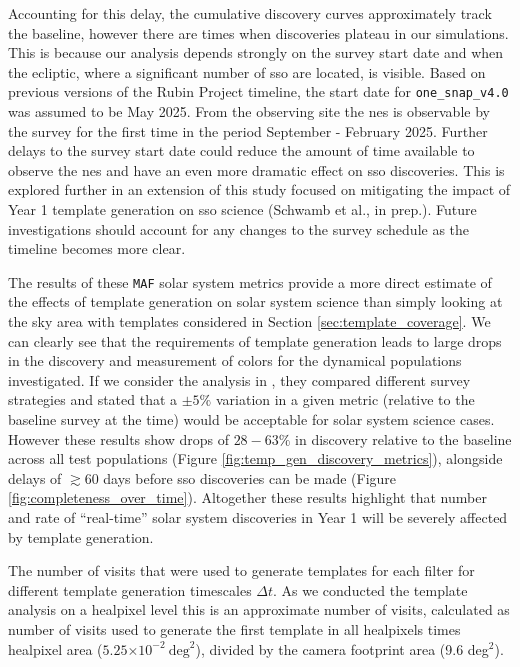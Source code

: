 \documentclass[preprintm,linenumbers]{aastex631}
\newcommand{\baseline}{\texttt{one\_snap\_v4.0}\xspace}
\newcommand{\maf}{\texttt{MAF}\xspace}
\providecommand{\e}[1]{\ensuremath{\times 10^{#1}}}
\begin{document}
Accounting for this delay, the cumulative discovery curves approximately track the baseline, however there are times when discoveries plateau in our simulations.
This is because our analysis depends strongly on the survey start date and when the ecliptic, where a significant number of \gls*{sso} are located, is visible. 
Based on previous versions of the Rubin Project timeline, the start date for \baseline was assumed to be May 2025.
From the observing site the \gls*{nes} is observable by the survey for the first time in the period September - February 2025. 
Further delays to the survey start date could reduce the amount of time available to observe the \gls*{nes} and have an even more dramatic effect on \gls*{sso} discoveries.
This is explored further in an extension of this study focused on mitigating the impact of Year 1 template generation on \gls*{sso} science (Schwamb et al., in prep.).
Future investigations should account for any changes to the survey schedule as the timeline becomes more clear.
		
		The results of these \maf solar system metrics provide a more direct estimate of the effects of template generation on solar system science than simply looking at the sky area with templates considered in Section \ref{sec:template_coverage}.
		We can clearly see that the requirements of template generation leads to large drops in the discovery and measurement of colors for the dynamical populations investigated.
		If we consider the analysis in \cite{schwambTuningLegacySurvey2023}, they compared different survey strategies and stated that a $\pm5\%$ variation in a given metric (relative to the baseline survey at the time) would be acceptable for solar system science cases.
		However these results show drops of $28-63\%$ in discovery relative to the baseline across all test populations (Figure \ref{fig:temp_gen_discovery_metrics}), alongside delays of $\gtrsim 60$ days before \gls*{sso} discoveries can be made (Figure \ref{fig:completeness_over_time}).
		Altogether these results highlight that number and rate of ``real-time'' solar system discoveries in Year 1 will be severely affected by template generation.
		
		

		\begin{table}
			\centering
			
			\caption{
				The number of visits that were used to generate templates for each filter for different template generation timescales $\Delta t$.
				As we conducted the template analysis on a healpixel level this is an approximate number of visits, calculated as number of visits used to generate the first template in all healpixels times healpixel area ($5.25\e{-2}\ \mathrm{deg}^2$), divided by the camera footprint area (9.6 deg$^2$).
			}
			\label{tab:year1_N_visits_templates}
		\end{table}
		
\end{document}
